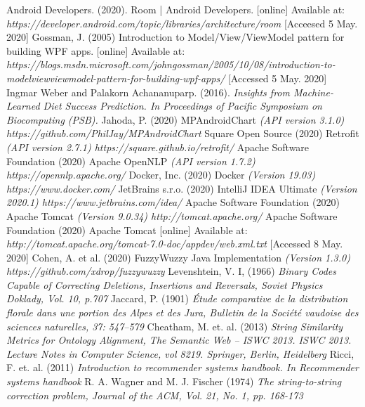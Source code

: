 \documentclass{article}
\begin{document}
\begin{thebibliography}{9}
Android Developers. (2020). Room | Android Developers. [online] Available at: 
\textit{https://developer.android.com/topic/libraries/architecture/room} [Acceesed 5 May. 2020]
Gossman, J. (2005) Introduction to Model/View/ViewModel pattern for building WPF apps. [online] Available at: \textit{https://blogs.msdn.microsoft.com/johngossman/2005/10/08/introduction-to-modelviewviewmodel-pattern-for-building-wpf-apps/} [Accessed 5 May. 2020]
Ingmar Weber and Palakorn Achananuparp. (2016). \textit{Insights from Machine-Learned Diet Success Prediction. In Proceedings of Pacific Symposium on Biocomputing (PSB).}
Jahoda, P. (2020) MPAndroidChart  \textit{(API version 3.1.0) https://github.com/PhilJay/MPAndroidChart}
Square Open Source (2020) Retrofit \textit{(API version 2.7.1) https://square.github.io/retrofit/}
Apache Software Foundation (2020) Apache OpenNLP \textit{(API version 1.7.2) https://opennlp.apache.org/}
Docker, Inc. (2020) Docker \textit{(Version 19.03) https://www.docker.com/}
JetBrains s.r.o. (2020) IntelliJ IDEA Ultimate \textit{(Version 2020.1) https://www.jetbrains.com/idea/}
Apache Software Foundation (2020) Apache Tomcat \textit{(Version 9.0.34) http://tomcat.apache.org/}
Apache Software Foundation (2020) Apache Tomcat [online] Available at: \textit{http://tomcat.apache.org/tomcat-7.0-doc/appdev/web.xml.txt} [Accessed 8 May. 2020]
Cohen, A. et al. (2020) FuzzyWuzzy Java Implementation \textit{(Version 1.3.0) https://github.com/xdrop/fuzzywuzzy} 
Levenshtein, V. I, (1966) \textit{Binary Codes Capable of Correcting Deletions, Insertions and Reversals, Soviet Physics Doklady, Vol. 10, p.707}
Jaccard, P. (1901) \textit{Étude comparative de la distribution florale dans une portion des Alpes et des Jura, Bulletin de la Société vaudoise des sciences naturelles, 37: 547–579}
Cheatham, M. et. al. (2013) \textit{String Similarity Metrics for Ontology Alignment, The Semantic Web – ISWC 2013. ISWC 2013. Lecture Notes in Computer Science, vol 8219. Springer, Berlin, Heidelberg}
Ricci, F. et. al. (2011) \textit{Introduction to recommender systems handbook. In Recommender systems handbook}
R. A. Wagner and M. J. Fischer (1974) \textit{The string-to-string correction problem, Journal of the ACM, Vol. 21, No. 1, pp. 168-173}

\end{thebibliography}
\end{document}
